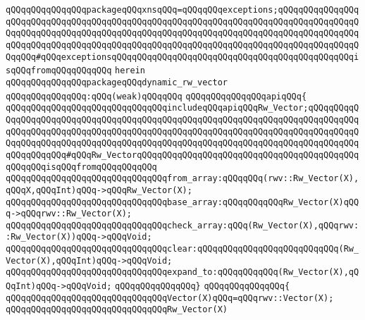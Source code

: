 \verb|qQQqqQQqqQQqqQQqpackageqQQqxnsqQQq=qQQqqQQqexceptions;qQQqqQQqqQQqqQQqqQQqqQQqqQQqqQQqqQQqqQQqqQQqqQQqqQQqqQQqqQQqqQQqqQQqqQQqqQQqqQQqqQQqqQQqqQQqqQQqqQQqqQQqqQQqqQQqqQQqqQQqqQQqqQQqqQQqqQQqqQQqqQQqqQQqqQQqqQQqqQQqqQQqqQQqqQQqqQQqqQQqqQQqqQQqqQQqqQQqqQQqqQQqqQQqqQQqqQQqqQQqqQQqqQQqqQQq#qQQqexceptionsqQQqqQQqqQQqqQQqqQQqqQQqqQQqqQQqqQQqqQQqqQQqqQQqisqQQqfromqQQqqQQqqQQq|\newline
\verb|herein|\newline
\newline
\verb|qQQqqQQqqQQqqQQqpackageqQQqdynamic_rw_vector|\newline
\verb|qQQqqQQqqQQqqQQq:qQQq(weak)qQQqqQQq|\newline
\verb|qQQqqQQqqQQqqQQqapiqQQq{|\newline
\verb|qQQqqQQqqQQqqQQqqQQqqQQqqQQqqQQqincludeqQQqapiqQQqRw_Vector;qQQqqQQqqQQqqQQqqQQqqQQqqQQqqQQqqQQqqQQqqQQqqQQqqQQqqQQqqQQqqQQqqQQqqQQqqQQqqQQqqQQqqQQqqQQqqQQqqQQqqQQqqQQqqQQqqQQqqQQqqQQqqQQqqQQqqQQqqQQqqQQqqQQqqQQqqQQqqQQqqQQqqQQqqQQqqQQqqQQqqQQqqQQqqQQqqQQqqQQqqQQqqQQqqQQqqQQqqQQqqQQqqQQqqQQq#qQQqRw_VectorqQQqqQQqqQQqqQQqqQQqqQQqqQQqqQQqqQQqqQQqqQQqqQQqqQQqisqQQqfromqQQqqQQqqQQq|\newline
\verb|qQQqqQQqqQQqqQQqqQQqqQQqqQQqqQQqfrom_array:qQQqqQQq(rwv::Rw_Vector(X),qQQqX,qQQqInt)qQQq->qQQqRw_Vector(X);|\newline
\verb|qQQqqQQqqQQqqQQqqQQqqQQqqQQqqQQqbase_array:qQQqqQQqqQQqRw_Vector(X)qQQq->qQQqrwv::Rw_Vector(X);|\newline
\verb|qQQqqQQqqQQqqQQqqQQqqQQqqQQqqQQqcheck_array:qQQq(Rw_Vector(X),qQQqrwv::Rw_Vector(X))qQQq->qQQqVoid;|\newline
\verb|qQQqqQQqqQQqqQQqqQQqqQQqqQQqqQQqclear:qQQqqQQqqQQqqQQqqQQqqQQqqQQq(Rw_Vector(X),qQQqInt)qQQq->qQQqVoid;|\newline
\verb|qQQqqQQqqQQqqQQqqQQqqQQqqQQqqQQqexpand_to:qQQqqQQqqQQq(Rw_Vector(X),qQQqInt)qQQq->qQQqVoid;|\newline
\verb|qQQqqQQqqQQqqQQq}|\newline
\verb|qQQqqQQqqQQqqQQq{|\newline
\newline
\verb|qQQqqQQqqQQqqQQqqQQqqQQqqQQqqQQqVector(X)qQQq=qQQqrwv::Vector(X);|\newline
\newline
\verb|qQQqqQQqqQQqqQQqqQQqqQQqqQQqqQQqRw_Vector(X)|\newline
